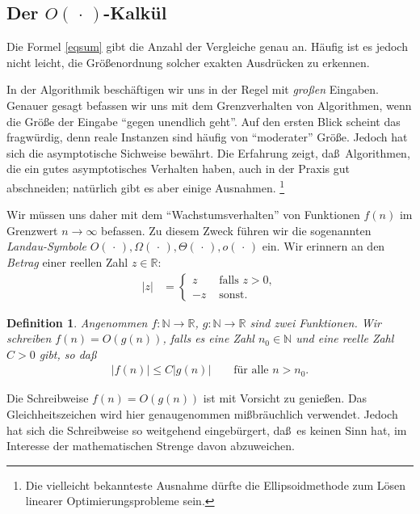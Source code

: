 \documentclass[10pt,reqno]{amsart}
\numberwithin{equation}{section}
\newcommand\nix{\,\cdot\,}
\newcommand\NN{\mathbb N}
\newcommand\RR{\mathbb R}
\newtheorem{definition}{Definition}[section]
\begin{document}
\subsection{Der $O(\nix)$-Kalk\"ul}\label{sec_asym}
Die Formel \eqref{eqsum} gibt die Anzahl der Vergleiche genau an.
H\"aufig ist es jedoch nicht leicht, die Gr\"o\ss enordnung solcher exakten Ausdr\"ucken zu erkennen. 

In der Algorithmik besch\"aftigen wir uns in der Regel mit {\em gro\ss en} Eingaben.
Genauer gesagt befassen wir uns mit dem Grenzverhalten von Algorithmen, wenn die Gr\"o\ss e der Eingabe ``gegen unendlich geht''.
Auf den ersten Blick scheint das fragw\"urdig, denn reale Instanzen sind h\"aufig von ``moderater'' Gr\"o\ss e.
Jedoch hat sich die asymptotische Sichweise bew\"ahrt.
Die Erfahrung zeigt, da\ss\ Algorithmen, die ein gutes asymptotisches Verhalten haben, auch in der Praxis gut abschneiden; nat\"urlich gibt es aber einige Ausnahmen.%
\footnote{Die vielleicht bekannteste Ausnahme d\"urfte die Ellipsoidmethode zum L\"osen linearer Optimierungsprobleme sein.}

Wir m\"ussen uns daher mit dem ``Wachstumsverhalten'' von Funktionen $f(n)$ im Grenzwert $n\to\infty$ befassen.
Zu diesem Zweck f\"uhren wir die sogenannten {\em Landau-Symbole} $O(\nix),\Omega(\nix),\Theta(\nix),o(\nix)$ ein.
Wir erinnern an den {\em Betrag} einer reellen Zahl $z\in\RR$:
	\begin{align*}
		|z|&=\begin{cases}z&\mbox{ falls }z>0,\\-z&\mbox{ sonst.}\end{cases}
	\end{align*}

\begin{definition}\label{def_O}
	Angenommen $f:\NN\to\RR$, $g:\NN\to\RR$ sind zwei Funktionen.
	Wir schreiben $f(n)=O(g(n))$, falls es eine Zahl $n_0\in\NN$ und eine reelle Zahl $C>0$ gibt, so da\ss
	\begin{align*}
		|f(n)|\leq C|g(n)|\qquad\mbox{f\"ur alle }n>n_0.
	\end{align*}
\end{definition}

Die Schreibweise $f(n)=O(g(n))$ ist mit Vorsicht zu genie\ss en.
Das Gleichheitszeichen wird hier genaugenommen mi\ss br\"auchlich verwendet.
Jedoch hat sich die Schreibweise so weitgehend eingeb\"urgert, da\ss\ es keinen Sinn hat, im Interesse der mathematischen Strenge davon abzuweichen.
\end{document}

